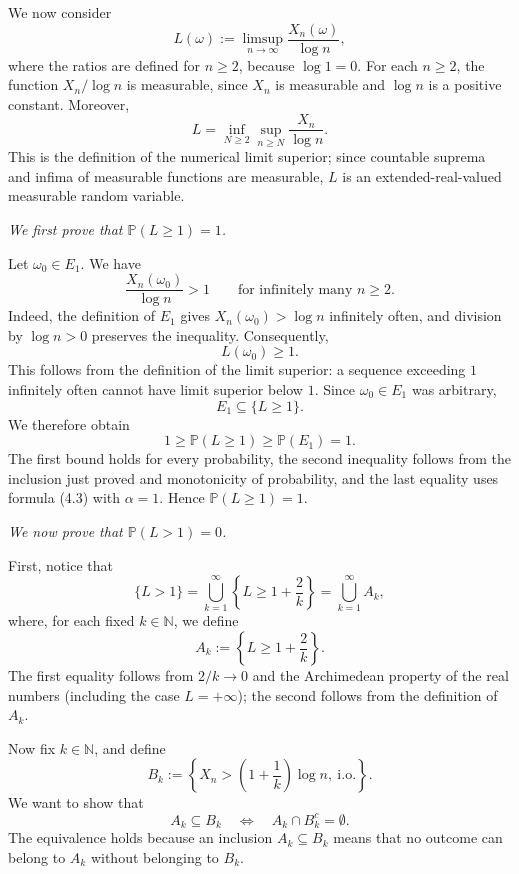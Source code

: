 \documentclass[11pt,a4paper]{article}
\begin{document}
We now consider
\[
L(\omega):=\limsup_{n\to\infty}\frac{X_n(\omega)}{\log n},
\]
where the ratios are defined for $n\ge2$, because $\log 1=0$. For each $n\ge2$, the function $X_n/\log n$ is measurable, since $X_n$ is measurable and $\log n$ is a positive constant. Moreover,
\[
L=\inf_{N\ge2}\sup_{n\ge N}\frac{X_n}{\log n}.
\]
This is the definition of the numerical limit superior; since countable suprema and infima of measurable functions are measurable, $L$ is an extended-real-valued measurable random variable.

\textit{We first prove that $\mathbb P(L\ge1)=1$.}

Let $\omega_0\in E_1$. We have
\[
\frac{X_n(\omega_0)}{\log n}>1
\qquad\text{for infinitely many }n\ge2.
\]
Indeed, the definition of $E_1$ gives $X_n(\omega_0)>\log n$ infinitely often, and division by $\log n>0$ preserves the inequality. Consequently,
\[
L(\omega_0)\ge1.
\]
This follows from the definition of the limit superior: a sequence exceeding $1$ infinitely often cannot have limit superior below $1$. Since $\omega_0\in E_1$ was arbitrary,
\[
E_1\subseteq\{L\ge1\}.
\]
We therefore obtain
\[
1\ge\mathbb P(L\ge1)\ge\mathbb P(E_1)=1.
\]
The first bound holds for every probability, the second inequality follows from the inclusion just proved and monotonicity of probability, and the last equality uses formula (4.3) with $\alpha=1$. Hence $\mathbb P(L\ge1)=1$.

\textit{We now prove that $\mathbb P(L>1)=0$.}

First, notice that
\[
\{L>1\}
=\bigcup_{k=1}^{\infty}\left\{L\ge1+\frac2k\right\}
=\bigcup_{k=1}^{\infty}A_k,
\]
where, for each fixed $k\in\mathbb N$, we define
\[
A_k:=\left\{L\ge1+\frac2k\right\}.
\]
The first equality follows from $2/k\to0$ and the Archimedean property of the real numbers (including the case $L=+\infty$); the second follows from the definition of $A_k$.

Now fix $k\in\mathbb N$, and define
\[
B_k:=\left\{X_n>\left(1+\frac1k\right)\log n,\ \text{i.o.}\right\}.
\]
We want to show that
\[
A_k\subseteq B_k
\quad\Longleftrightarrow\quad
A_k\cap B_k^c=\emptyset.
\]
The equivalence holds because an inclusion $A_k\subseteq B_k$ means that no outcome can belong to $A_k$ without belonging to $B_k$.
\end{document}
